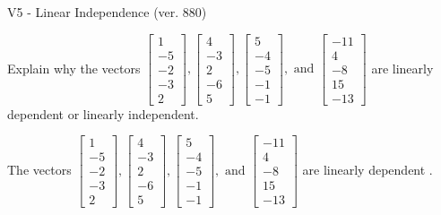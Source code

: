 \begin{exercise}
  \begin{exerciseTitle}V5 - Linear Independence (ver. 880)\end{exerciseTitle}
  \begin{exerciseStatement}
    Explain why the vectors \(\left[\begin{array}{r}
1 \\
-5 \\
-2 \\
-3 \\
2
\end{array}\right] , \left[\begin{array}{r}
4 \\
-3 \\
2 \\
-6 \\
5
\end{array}\right] , \left[\begin{array}{r}
5 \\
-4 \\
-5 \\
-1 \\
-1
\end{array}\right] , \text{ and } \left[\begin{array}{r}
-11 \\
4 \\
-8 \\
15 \\
-13
\end{array}\right]\) are linearly dependent or linearly independent.	


  \end{exerciseStatement}
  \begin{exerciseAnswer}
   The vectors \(\left[\begin{array}{r}
1 \\
-5 \\
-2 \\
-3 \\
2
\end{array}\right] , \left[\begin{array}{r}
4 \\
-3 \\
2 \\
-6 \\
5
\end{array}\right] , \left[\begin{array}{r}
5 \\
-4 \\
-5 \\
-1 \\
-1
\end{array}\right] , \text{ and } \left[\begin{array}{r}
-11 \\
4 \\
-8 \\
15 \\
-13
\end{array}\right]\) are 
  	 linearly dependent  .
  


  \end{exerciseAnswer}
\end{exercise}